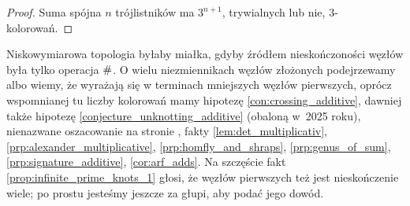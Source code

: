 \begin{proof}
    Suma spójna $n$ trójlistników ma $3^{n+1}$, trywialnych lub nie, $3$-kolorowań.
\end{proof}

Niskowymiarowa topologia byłaby miałka, gdyby źródłem nieskończoności węzłów była tylko operacja $\mathbin{\#}$.
O wielu niezmiennikach węzłów złożonych podejrzewamy albo wiemy, że wyrażają się w terminach mniejszych węzłów pierwszych, oprócz wspomnianej tu liczby kolorowań mamy hipotezę \ref{con:crossing_additive}, dawniej także hipotezę \ref{conjecture_unknotting_additive} (obaloną w~2025 roku), nienazwane oszacowanie na stronie \pageref{stick_bounded_factors}, fakty \ref{lem:det_multiplicativ}, \ref{prp:alexander_multiplicative}, \ref{prp:homfly_and_shraps}, \ref{prp:genus_of_sum}, \ref{prp:signature_additive}, \ref{cor:arf_adds}.
Na szczęście fakt \ref{prop:infinite_prime_knots_1} głosi, że węzłów pierwszych też jest nieskończenie wiele; po prostu jesteśmy jeszcze za głupi, aby podać jego dowód.




%

